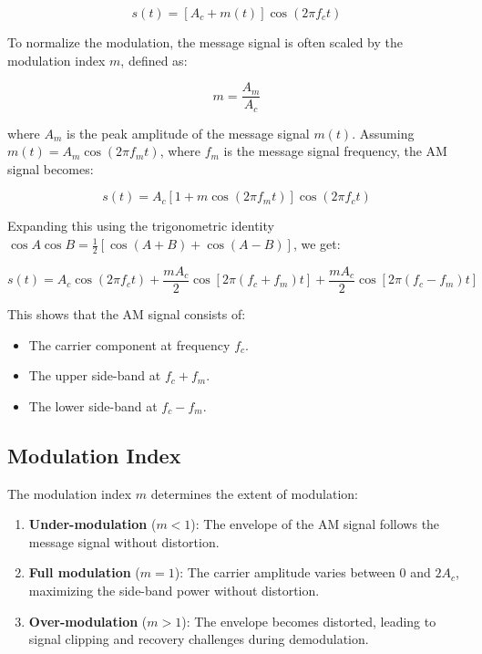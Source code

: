 \documentclass[a4paper,12pt]{article}
\begin{document}
\begin{equation}
	s(t) = \left[ A_c + m(t) \right] \cos(2\pi f_c t)
\end{equation}

To normalize the modulation, the message signal is often scaled by the modulation index \( m \), defined as:

\begin{equation}
	m = \frac{A_m}{A_c}
\end{equation}

where \( A_m \) is the peak amplitude of the message signal \( m(t) \). Assuming \( m(t) = A_m \cos(2\pi f_m t) \), where \( f_m \) is the message signal frequency, the AM signal becomes:

\begin{equation}
	s(t) = A_c \left[ 1 + m \cos(2\pi f_m t) \right] \cos(2\pi f_c t)
\end{equation}

Expanding this using the trigonometric identity \( \cos A \cos B = \frac{1}{2} [\cos(A+B) + \cos(A-B)] \), we get:

\begin{equation}
	s(t) = A_c \cos(2\pi f_c t) + \frac{m A_c}{2} \cos[2\pi (f_c + f_m) t] + \frac{m A_c}{2} \cos[2\pi (f_c - f_m) t]
\end{equation}

This shows that the AM signal consists of:
\begin{itemize}
	\item The carrier component at frequency \( f_c \).
	\item The upper side-band at \( f_c + f_m \).
	\item The lower side-band at \( f_c - f_m \).
\end{itemize}

\subsection{Modulation Index}
The modulation index \( m \) determines the extent of modulation:
\begin{enumerate}
	\item \textbf{Under-modulation} (\( m < 1 \)): The envelope of the AM signal follows the message signal without distortion.
	\item \textbf{Full modulation} (\( m = 1 \)): The carrier amplitude varies between 0 and \( 2A_c \), maximizing the side-band power without distortion.
	\item \textbf{Over-modulation} (\( m > 1 \)): The envelope becomes distorted, leading to signal clipping and recovery challenges during demodulation.
\end{enumerate}
\end{document}
